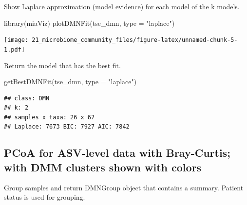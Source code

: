 \documentclass[
]{book}
\newenvironment{Shaded}{\begin{snugshade}}{\end{snugshade}}
\newcommand{\AttributeTok}[1]{\textcolor[rgb]{0.77,0.63,0.00}{#1}}
\newcommand{\DecValTok}[1]{\textcolor[rgb]{0.00,0.00,0.81}{#1}}
\newcommand{\FunctionTok}[1]{\textcolor[rgb]{0.00,0.00,0.00}{#1}}
\newcommand{\NormalTok}[1]{#1}
\newcommand{\OtherTok}[1]{\textcolor[rgb]{0.56,0.35,0.01}{#1}}
\newcommand{\SpecialCharTok}[1]{\textcolor[rgb]{0.00,0.00,0.00}{#1}}
\newcommand{\StringTok}[1]{\textcolor[rgb]{0.31,0.60,0.02}{#1}}
\begin{document}
Show Laplace approximation (model evidence) for each model of the k models.

\begin{Shaded}
\begin{Highlighting}[]
\FunctionTok{library}\NormalTok{(miaViz)}
\FunctionTok{plotDMNFit}\NormalTok{(tse\_dmn, }\AttributeTok{type =} \StringTok{"laplace"}\NormalTok{)}
\end{Highlighting}
\end{Shaded}

\texttt{[image: 21\_microbiome\_community\_files/figure-latex/unnamed-chunk-5-1.pdf]}

Return the model that has the best fit.

\begin{Shaded}
\begin{Highlighting}[]
\FunctionTok{getBestDMNFit}\NormalTok{(tse\_dmn, }\AttributeTok{type =} \StringTok{"laplace"}\NormalTok{)}
\end{Highlighting}
\end{Shaded}

\begin{verbatim}
## class: DMN 
## k: 2 
## samples x taxa: 26 x 67 
## Laplace: 7673 BIC: 7927 AIC: 7842
\end{verbatim}

\hypertarget{pcoa-for-asv-level-data-with-bray-curtis-with-dmm-clusters-shown-with-colors}{%
\subsection{PCoA for ASV-level data with Bray-Curtis; with DMM clusters shown with colors}\label{pcoa-for-asv-level-data-with-bray-curtis-with-dmm-clusters-shown-with-colors}}

Group samples and return DMNGroup object that contains a summary.
Patient status is used for grouping.

\begin{Shaded}
\end{Shaded}
\end{document}
